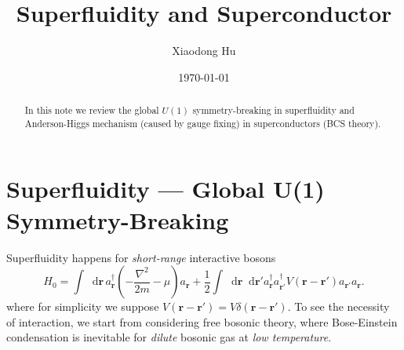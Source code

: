 \documentclass[10pt,nofootinbib]{revtex4}
\newcommand*\dd{\mathop{}\!\mathrm{d}}
\begin{document}
\title{Superfluidity and Superconductor}%

\author{Xiaodong Hu}

\date{\today}


\begin{abstract}
	In this note we review the global $U(1)$ symmetry-breaking in superfluidity and Anderson-Higgs mechanism (caused by gauge fixing) in superconductors (BCS theory).
\end{abstract}
\maketitle
\tableofcontents

\section{Superfluidity --- Global U(1) Symmetry-Breaking}
		Superfluidity happens for \emph{short-range} interactive bosons
		\begin{equation}\label{1.1}
			H_0=\int\dd\bm{r}\,a^\dagger_{\bm{r}}\left(-\dfrac{\nabla^2}{2m}-\mu\right)a_{\bm{r}}+\dfrac{1}{2}\int\dd\bm{r}\dd\bm{r'}a_{\bm{r}}^\dagger a_{\bm{r'}}^\dagger V(\bm{r}-\bm{r'})a_{\bm{r'}}a_{\bm{r}}.
		\end{equation}
		where for simplicity we suppose $V(\bm{r}-\bm{r'})=V\delta(\bm{r}-\bm{r'})$. To see the necessity of interaction, we start from considering free bosonic theory, where Bose-Einstein condensation is inevitable for \emph{dilute} bosonic gas at \emph{low temperature}.
\end{document}
